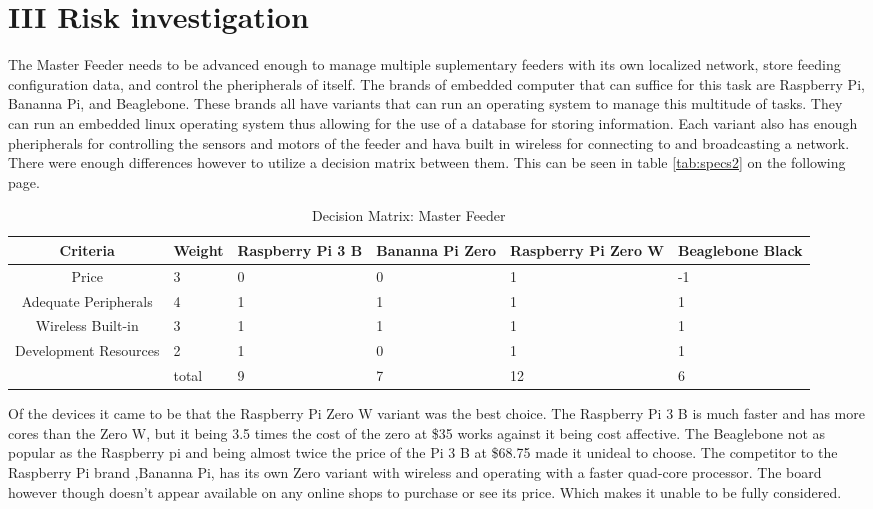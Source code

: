 \documentclass[12pt]{article}
\begin{document}
\section{III Risk investigation}
The Master Feeder needs to be advanced enough to manage multiple suplementary
feeders with its own localized network, store feeding configuration data, and control
the pheripherals of itself.  The brands of embedded computer that can suffice
for this task are Raspberry Pi, Bananna Pi, and Beaglebone.  These brands all
have variants that can run an operating system to manage this multitude of
tasks.  They can run an embedded linux operating system thus allowing for the
use of a database for storing information.  Each variant also has enough pheripherals
for controlling the sensors and motors of the feeder and hava built in wireless
for connecting to and broadcasting a network.  There were enough differences however
to utilize a decision matrix between them. This can be seen in table \autoref{tab:specs2}
on the following page.

\begin{table}[H]
    \centering
    \caption{Decision Matrix: Master Feeder}
    \label{tab:specs2}
    \begin{tabularx}{\linewidth}{cXXXXX} \toprule
        Criteria & Weight & Raspberry Pi 3 B & Bananna Pi Zero & Raspberry Pi Zero W & Beaglebone Black\\ \midrule
        Price                 & 3 & 0 & 0 & 1 & -1 \\
        Adequate Peripherals  & 4 & 1 & 1 & 1 & 1\\
        Wireless Built-in     & 3 & 1 & 1 & 1 & 1\\
        Development Resources & 2 & 1 & 0 & 1 & 1\\
        & total                   & 9 & 7 & 12 & 6
    \end{tabularx}
\end{table}

Of the devices it came to be that the Raspberry Pi Zero W variant was the best choice.  The Raspberry Pi 3 B
is much faster and has more cores than the Zero W, but it being 3.5 times the cost of the zero at \$35 works against
it being cost affective.  The Beaglebone not as popular as the Raspberry pi and being almost twice the price of the Pi 3 B
at \$68.75 made it unideal to choose.  The competitor to the Raspberry Pi brand ,Bananna Pi, has its own Zero variant
with wireless and operating with a faster quad-core processor.  The board however though doesn't appear available on any
online shops to purchase or see its price.  Which makes it unable to be fully considered.
\end{document}
